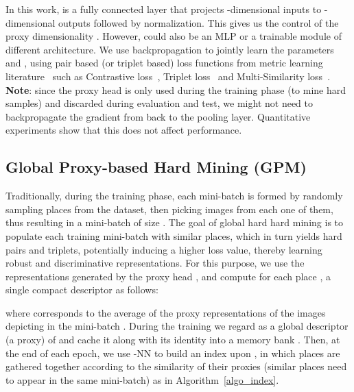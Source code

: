 \documentclass{bmvc2k}
\begin{document}
In this work,  is a fully connected layer that projects -dimensional inputs to -dimensional outputs followed by  normalization. This gives us  the control of the proxy dimensionality . However,  could also be an MLP or a trainable module of different architecture.
We use backpropagation to jointly learn the parameters  and , using pair based (or triplet based) loss functions from metric learning literature~\cite{musgrave2020metric} such as Contrastive loss~\cite{hadsell2006dimensionality}, Triplet loss~\cite{hermans2017defense} and Multi-Similarity loss~\cite{wang2019multi}. \textbf{Note}: since the proxy head is only used during the training phase (to mine hard samples) and discarded during evaluation and test, we might not need to backpropagate the gradient from  back to the pooling layer. Quantitative experiments show that this does not affect performance.

\subsection{Global Proxy-based Hard Mining (GPM)}\label{ssec:gpm}
Traditionally, during the training phase, each mini-batch is formed by randomly sampling  places from the dataset, then picking  images from each one of them, thus resulting in a mini-batch  of size .
The goal of global hard hard mining is to populate each training mini-batch with  similar places, which in turn yields hard pairs and triplets, potentially inducing a higher loss value, thereby learning robust and discriminative representations. For this purpose, we use the representations generated by the proxy head , and compute for each place , a single compact descriptor  as follows:

where  corresponds to the average of the proxy representations of the images depicting  in the mini-batch . During the training we regard  as a global descriptor (a proxy) of  and cache it along with its identity  into a memory bank . Then, at the end of each epoch, we use -NN to build an index upon , in which places are gathered together according to the similarity of their proxies (similar places need to appear in the same mini-batch) as in Algorithm~\ref{algo_index}.
\end{document}
